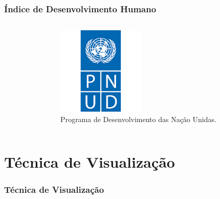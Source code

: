 \documentclass[aspectratio=169]{beamer}
\begin{document}
\begin{frame}
\frametitle{Índice de Desenvolvimento Humano}
\justifying

\begin{columns}

\begin{column}{0.5\textwidth}


\end{column}

\begin{column}{0.5\textwidth}

\begin{figure}
\centering
\includegraphics[width=0.45\textwidth]{images/pnud.png}
\caption{Programa de Desenvolvimento das Nação Unidas.}
\end{figure}

\begin{figure}
\centering
\end{figure}


\end{column}
\end{columns}



\end{frame}

\section{Técnica de Visualização}
\begin{frame}
\frametitle{Técnica de Visualização}
\justifying

\begin{columns}

\begin{column}{0.5\textwidth}


\end{column}

\begin{column}{0.5\textwidth}

\begin{figure}
\centering
\end{figure}


\end{column}
\end{columns}


\end{frame}
\end{document}
